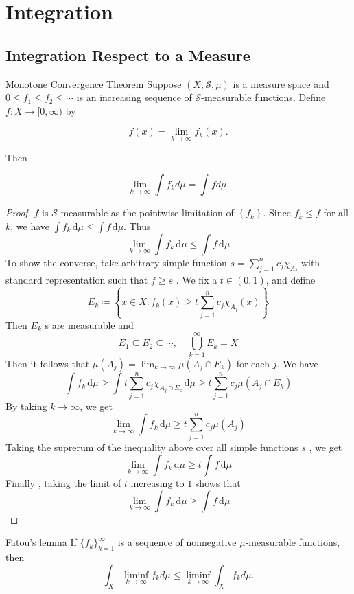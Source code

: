 \documentclass[../main.tex]{subfiles}
\begin{document}
\ifSubfilesClassLoaded{

    \tableofcontents
    
}{}

\chapter{ Integration }

\section{Integration Respect to a Measure}
\begin{theorem}{Monotone Convergence Theorem}{}
    Suppose $(X, \mathcal{S}, \mu)$ is a measure space and $0 \leq f_1 \leq f_2 \leq \cdots$ is an increasing sequence of $\mathcal{S}$-measurable functions. Define $f: X \to [0, \infty)$ by

\[
f(x) = \lim_{k \to \infty} f_k(x).
\]

Then

\[
\lim_{k \to \infty} \int f_k d\mu = \int f d\mu.
\]
\end{theorem}

\begin{proof}
    \(  f  \) is \(  \mathcal{S}  \)-measurable as the pointwise limitation of \(  \left\{ f_{k} \right\}  \). Since \(  f_{k}\le f  \) for all \(  k  \), we have \(  \int f_{k}\,\mathrm{d} \mu \le \int f\,\mathrm{d} \mu   \). Thus \[
    \lim_{k\to \infty}\int f_{k}\,\mathrm{d} \mu \le \int f\,\mathrm{d} \mu 
    \]      
    To show the converse, take arbitrary simple function \(s=   \sum _{j= 1}^{n}c_{j} \chi _{A_{j}}  \) with standard representation such that \(  f\ge s \) . We fix a \(  t \in \left( 0,1 \right)   \),  and define \[
    E_{k}\coloneqq \left\{ x \in X: f_{k}\left( x \right)\ge   t \sum _{j= 1}^{n}c_{j}\chi _{A_{j}}\left( x \right) \right\}
    \]  Then \(  E_{k}  \) s are measurable and \[
    E_1\subseteq E_2\subseteq \cdots ,\quad \bigcup _{k= 1}^{\infty}E_{k}= X
    \] Then it follows that \(  \mu \left( A_{j} \right)= \lim_{k\to \infty}\mu \left( A_{j}\cap E_{k} \right)    \) for each \(  j  \). We have \[
    \int f_{k}\,\mathrm{d} \mu \ge \int t \sum _{j= 1}^{n}c_{j}\chi _{A_{j}\cap E_{k}}\,\mathrm{d} \mu \ge   t \sum _{j= 1}^{n}c_{j}\mu \left( A_{j}\cap E_{k} \right) 
    \]  By taking \(  k\to \infty  \), we get \[
    \lim_{k\to \infty}\int f_{k}\,\mathrm{d} \mu\ge   t \sum _{j= 1}^{n}c_{j}\mu \left( A_{j} \right)  
    \] Taking the suprerum of the inequality above over all simple functions \(  s  \)  , we get \[
    \lim_{k\to \infty} \int f_{k}\,\mathrm{d} \mu \ge   t \int f\,\mathrm{d} \mu 
    \]Finally , taking the limit of \(  t  \) increasing to \(  1  \) shows that  \[
    \lim_{k\to \infty}\int f_{k} \,\mathrm{d} \mu \ge \int f\,\mathrm{d} \mu 
    \]
\end{proof}
\begin{lemma}{Fatou's lemma}{}
If $\{f_k\}_{k=1}^\infty$ is a sequence of nonnegative $\mu$-measurable functions, then
\[
\int_X \liminf_{k\to\infty} f_k d\mu \leq \liminf_{k\to\infty} \int_X f_k d\mu.
\]
\end{lemma}
\end{document}
